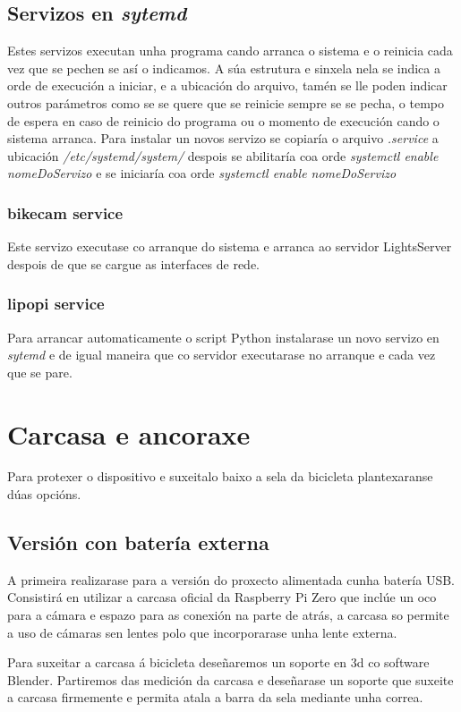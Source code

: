 \subsection{Servizos en \emph{sytemd}}
    Estes servizos executan unha programa cando arranca o sistema e o reinicia cada vez que se pechen se así o indicamos. A súa estrutura e sinxela nela se indica a orde de execución a iniciar, e a ubicación do arquivo, tamén se lle poden indicar outros parámetros como se se quere que se reinicie sempre se se pecha, o tempo de espera en caso de reinicio do programa ou o momento de execución cando o sistema arranca.
    Para instalar un novos servizo se copiaría o arquivo \emph{.service} a ubicación \emph{/etc/systemd/system/} despois se abilitaría coa orde \emph{systemctl enable nomeDoServizo} e se iniciaría coa orde  \emph{systemctl enable nomeDoServizo}
    \subsubsection{bikecam service}
    Este servizo executase co arranque do sistema e arranca ao servidor LightsServer despois de que se cargue as interfaces de rede.
    \subsubsection{lipopi service}
    Para arrancar automaticamente o script Python instalarase un novo servizo en \emph{sytemd} e de igual maneira que co servidor executarase no arranque e cada vez que se pare.

\section{Carcasa e ancoraxe}

Para protexer o dispositivo e suxeitalo baixo a sela da bicicleta plantexaranse dúas opcións.

    \subsection{Versión con batería externa}

    A primeira realizarase para a versión do proxecto alimentada cunha batería USB. Consistirá en utilizar a carcasa oficial da Raspberry Pi Zero que inclúe un oco para a cámara e espazo para as conexión na parte de atrás, a carcasa so permite a uso de cámaras sen lentes polo que incorporarase unha lente externa.

    Para suxeitar a carcasa á bicicleta deseñaremos un soporte en 3d co software Blender. Partiremos das medición da carcasa e deseñarase un soporte que suxeite a carcasa firmemente e permita atala a barra da sela mediante unha correa.

